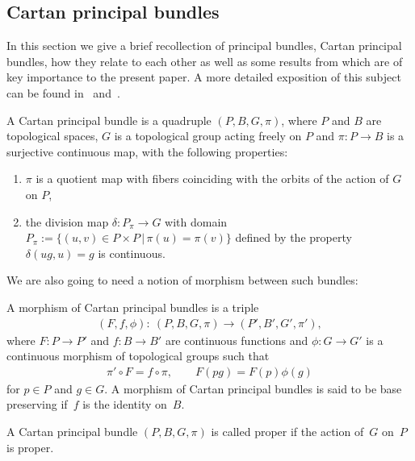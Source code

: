 \documentclass[11pt]{article}
\begin{document}
\subsection{Cartan principal bundles}
In this section we give a brief recollection of principal bundles, Cartan principal bundles, how they relate to each other as well as some results from \cite{P} which are of key importance to the present paper. A more detailed exposition of this subject can be found in~\cite{McK1} and~\cite{P}.
\begin{defi} A Cartan principal bundle is a quadruple $(P,B,G,\pi)$, where $P$ and $B$ are topological spaces, $G$ is a topological group acting freely on $P$ and $\pi\colon P\rightarrow B$ is a surjective continuous map, with the following properties:
\begin{enumerate}\itemsep=0pt
\item[1)] $\pi$ is a quotient map with fibers coinciding with the orbits of the action of $G$ on $P$,
\item[2)] the division map $\delta\colon P_{\pi}\rightarrow G$ with domain $P_{\pi}:=\{(u,v)\in P\times P\, |\, \pi(u)=\pi(v)\}$ defined by the property $\delta(ug,u)=g$ is continuous.
\end{enumerate}
\end{defi}
We are also going to need a notion of morphism between such bundles:
\begin{defi}A morphism of Cartan principal bundles is a triple
\begin{gather*} (F,f,\phi)\colon \ (P,B,G,\pi)\rightarrow (P',B',G',\pi'),\end{gather*} where $F\colon P\rightarrow P'$ and $f\colon B\rightarrow B'$ are continuous functions and $\phi\colon G\rightarrow G'$ is a continuous morphism of topological groups such that
\begin{gather*}
\pi'\circ F=f\circ\pi, \qquad F(pg)=F(p)\phi(g)
\end{gather*}
for $p\in P$ and $g\in G$. A morphism of Cartan principal bundles is said to be base preserving if~$f$ is the identity on~$B$.
\end{defi}
\begin{defi} A Cartan principal bundle $(P,B,G,\pi)$ is called proper if the action of~$G$ on~$P$ is proper.
\end{defi}
\end{document}
